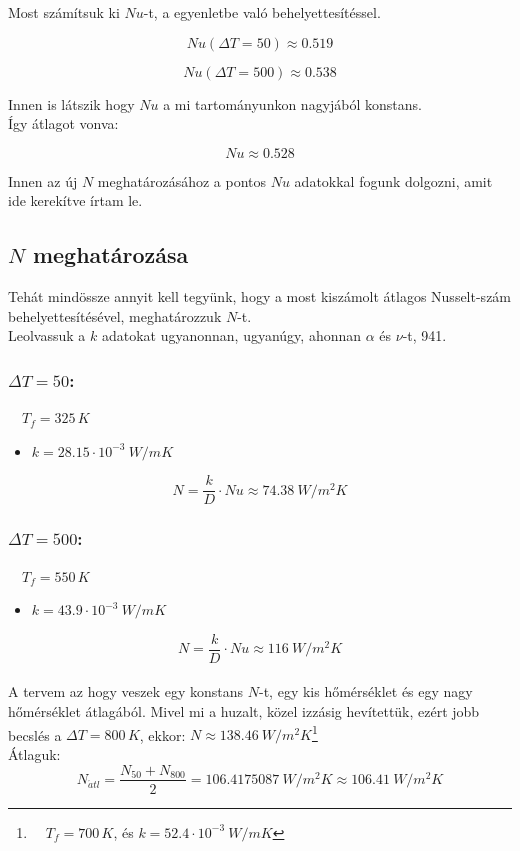 \documentclass[a4paper, 10pt, oneside]{article}
\begin{document}
Most számítsuk ki $Nu$-t, a  egyenletbe való behelyettesítéssel.

$$Nu(\Delta T = 50) \approx 0.519 $$

$$Nu(\Delta T = 500) \approx 0.538 $$

Innen is látszik hogy $Nu$ a mi tartományunkon nagyjából konstans.\\
Így átlagot vonva:

$$\boxed{Nu \approx 0.528} $$

Innen az új $N$ meghatározásához a pontos $Nu$ adatokkal fogunk dolgozni, amit ide kerekítve írtam le.


\subsection{$N$ meghatározása}

Tehát mindössze annyit kell tegyünk, hogy a most kiszámolt átlagos Nusselt-szám behelyettesítésével, meghatározzuk
$N$-t.\\
Leolvassuk a $k$ adatokat ugyanonnan, ugyanúgy, ahonnan $\alpha$ és $\nu$-t, \cite{heat_and_mass} 941.

\subsubsection*{$\Delta T = 50$:}
 $\quad T_f = 325\, K$
\begin{itemize}
	\item $k = 28.15 \cdot 10^{-3}\ W/mK$
\end{itemize}

\[
N = \frac{k}{D} \cdot Nu \approx 74.38\ W/m^2K
\]

\subsubsection*{$\Delta T = 500$:}
 $\quad T_f = 550\, K$
\begin{itemize}
	\item $k = 43.9 \cdot 10^{-3}\ W/mK$
\end{itemize}

\[
N = \frac{k}{D} \cdot Nu \approx 116\ W/m^2K
\]
\\
A tervem az hogy veszek egy konstans $N$-t, egy kis hőmérséklet és egy nagy hőmérséklet átlagából. Mivel mi a huzalt,
közel izzásig hevítettük, ezért jobb becslés a $\Delta T = 800\, K$, ekkor: $N \approx 138.46\ W/m^2K$\footnote{$\quad T_f = 700\, K$, és $k = 52.4 \cdot 10^{-3}\ W/mK$}\\
Átlaguk:
\[
N_{\acute{a}tl} = \frac{N_{50} + N_{800}}{2} = 106.4175087\ W/m^2K \approx 106.41\ W/m^2K
\]
\end{document}
